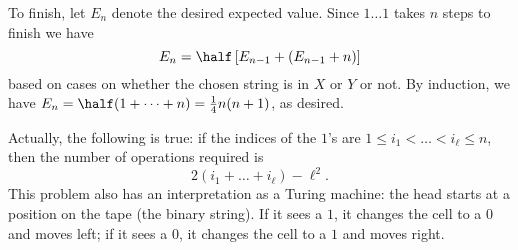 To finish, let $E_n$ denote the desired expected value.
Since $1 \dots 1$ takes $n$ steps to finish we have
\[ E_n = \half \left[ E_{n-1} + (E_{n-1}+n) \right] \]
based on cases on whether the chosen string is in $X$ or $Y$ or not.
By induction, we have $E_n = \half (1 + \dots + n) = \frac14 n(n+1)$,
as desired.

\begin{remark*}
  Actually, the following is true:
  if the indices of the $1$'s are $1 \le i_1 < \dots < i_\ell \le n$,
  then the number of operations required is
  \[ 2(i_1 + \dots + i_\ell) - \ell^2. \]
  This problem also has an interpretation as a Turing machine:
  the head starts at a position on the tape (the binary string).
  If it sees a $1$, it changes the cell to a $0$ and moves left;
  if it sees a $0$, it changes the cell to a $1$ and moves right.
\end{remark*}
